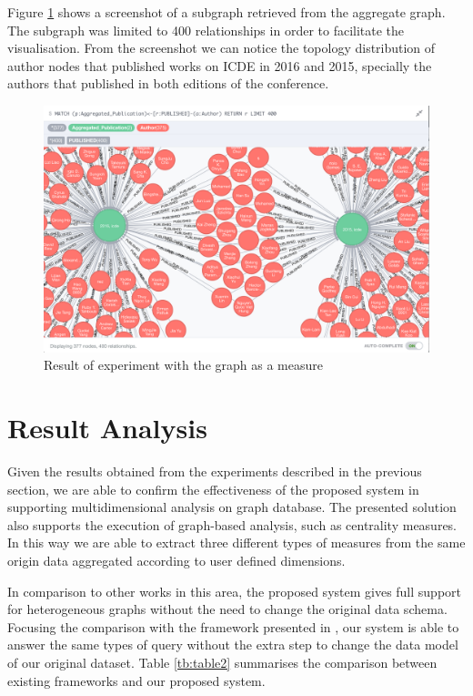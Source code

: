 Figure \ref{fig:figure37} shows a screenshot of a subgraph retrieved from the aggregate graph. The subgraph was limited to 400 relationships in order to facilitate the visualisation. From the screenshot we can notice the topology distribution of author nodes that published works on ICDE in 2016 and 2015, specially the authors that published in both editions of the conference.

\begin{figure}[!h]
\centering
\includegraphics[width=1\textwidth]{../graph_measure.png}
\caption{Result of experiment with the graph as a measure}
\label{fig:figure37}
\end{figure}

\section{Result Analysis}
Given the results obtained from the experiments described in the previous section, we are able to confirm the effectiveness of the proposed system in supporting multidimensional analysis on graph database. The presented solution also supports the execution of graph-based analysis, such as centrality measures. In this way we are able to extract three different types of measures from the same origin data aggregated according to user defined dimensions.

In comparison to other works in this area, the proposed system gives full support for heterogeneous graphs without the need to change the original data schema. Focusing the comparison with the framework presented in \cite{Ghrab2013}, our system is able to answer the same types of query without the extra step to change the data model of our original dataset. Table \ref{tb:table2} summarises the comparison between existing frameworks and our proposed system.

